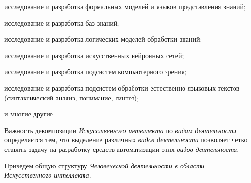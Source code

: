\begin{textitemize}
	\item
	исследование и разработка формальных моделей и языков представления знаний;
	\item
	исследование и разработка баз знаний;
	\item
	исследование и разработка логических моделей обработки знаний;
	\item
	исследование и разработка искусственных нейронных сетей;
	\item
	исследование и разработка подсистем компьютерного зрения;
	\item
	исследование и разработка подсистем обработки естественно-языковых текстов (синтаксический анализ, понимание, синтез);
	\item
	и многие другие.
\end{textitemize}

Важность декомпозиции \textit{Искусственного интеллекта} по \textit{видам} \textit{деятельности} определяется тем, что выделение различных \textit{видов деятельности} позволяет четко ставить задачу на разработку средств автоматизации этих \textit{видов деятельности}.

Приведем общую структуру \textit{Человеческой деятельности в области Искусственного интеллекта}.

